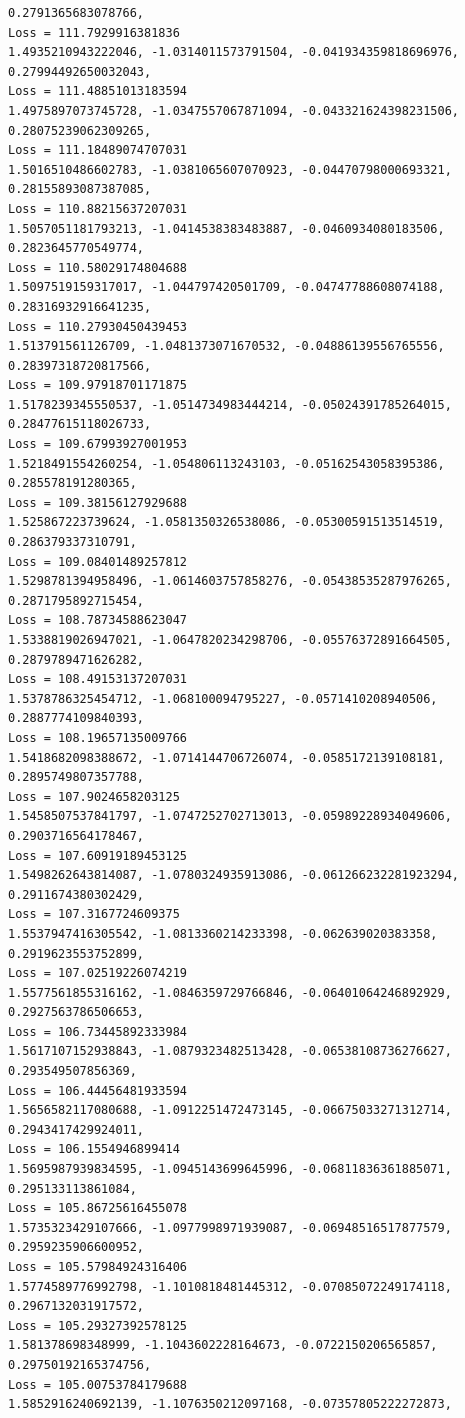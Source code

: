 \documentclass[11pt]{article}
\begin{document}
\begin{Verbatim}[commandchars=\\\{\}]
0.2791365683078766,
Loss = 111.7929916381836
1.4935210943222046, -1.0314011573791504, -0.041934359818696976,
0.27994492650032043,
Loss = 111.48851013183594
1.4975897073745728, -1.0347557067871094, -0.043321624398231506,
0.28075239062309265,
Loss = 111.18489074707031
1.5016510486602783, -1.0381065607070923, -0.04470798000693321,
0.28155893087387085,
Loss = 110.88215637207031
1.5057051181793213, -1.0414538383483887, -0.0460934080183506,
0.2823645770549774,
Loss = 110.58029174804688
1.5097519159317017, -1.044797420501709, -0.04747788608074188,
0.28316932916641235,
Loss = 110.27930450439453
1.513791561126709, -1.0481373071670532, -0.04886139556765556,
0.28397318720817566,
Loss = 109.97918701171875
1.5178239345550537, -1.0514734983444214, -0.05024391785264015,
0.28477615118026733,
Loss = 109.67993927001953
1.5218491554260254, -1.054806113243103, -0.05162543058395386, 0.285578191280365,
Loss = 109.38156127929688
1.525867223739624, -1.0581350326538086, -0.05300591513514519, 0.286379337310791,
Loss = 109.08401489257812
1.5298781394958496, -1.0614603757858276, -0.05438535287976265,
0.2871795892715454,
Loss = 108.78734588623047
1.5338819026947021, -1.0647820234298706, -0.05576372891664505,
0.2879789471626282,
Loss = 108.49153137207031
1.5378786325454712, -1.068100094795227, -0.0571410208940506, 0.2887774109840393,
Loss = 108.19657135009766
1.5418682098388672, -1.0714144706726074, -0.0585172139108181,
0.2895749807357788,
Loss = 107.9024658203125
1.5458507537841797, -1.0747252702713013, -0.05989228934049606,
0.2903716564178467,
Loss = 107.60919189453125
1.5498262643814087, -1.0780324935913086, -0.061266232281923294,
0.2911674380302429,
Loss = 107.3167724609375
1.5537947416305542, -1.0813360214233398, -0.062639020383358, 0.2919623553752899,
Loss = 107.02519226074219
1.5577561855316162, -1.0846359729766846, -0.06401064246892929,
0.2927563786506653,
Loss = 106.73445892333984
1.5617107152938843, -1.0879323482513428, -0.06538108736276627,
0.293549507856369,
Loss = 106.44456481933594
1.5656582117080688, -1.0912251472473145, -0.06675033271312714,
0.2943417429924011,
Loss = 106.1554946899414
1.5695987939834595, -1.0945143699645996, -0.06811836361885071,
0.295133113861084,
Loss = 105.86725616455078
1.5735323429107666, -1.0977998971939087, -0.06948516517877579,
0.2959235906600952,
Loss = 105.57984924316406
1.5774589776992798, -1.1010818481445312, -0.07085072249174118,
0.2967132031917572,
Loss = 105.29327392578125
1.581378698348999, -1.1043602228164673, -0.0722150206565857,
0.29750192165374756,
Loss = 105.00753784179688
1.5852916240692139, -1.1076350212097168, -0.07357805222272873,

\end{Verbatim}
\end{document}
